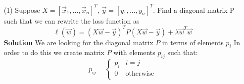 \documentclass[11pt]{article}
\begin{document}
	\begin{enumerate}[(1)]
		\item[(1)] Suppose $X = [\vec{x}_1, ..., \vec{x}_n]^T$, $\vec{y} = [y_1, ..., y_n]^T$. Find a diagonal matrix P such that we can rewrite the loss function as $$\ell(\vec{w}) =  (X\vec{w} - \vec{y})^TP(X\vec{w} - \vec{y}) + \lambda \vec{w}^T \vec{w}$$
		\newline
		\newline
		\textbf{Solution}
		We are looking for the diagonal matrix $P$ in terms of elements $p_i$
		\newline
		In order to do this we create matrix $P$ with elements $p_{ij}$ such that:
		\newline
		$$p_{ij} = 
		\begin{cases} 
		p_i & i = j \\
		0 & \text{otherwise} \\ 
		\end{cases}		
		$$
		

\end{enumerate}
\end{document}
